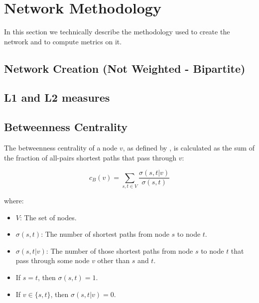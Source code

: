 \section{Network Methodology}
In this section we technically describe the methodology used to create the network and to compute metrics on it.
\subsection{Network Creation (Not Weighted - Bipartite)}


\subsection{L1 and L2 measures}




\subsection{Betweenness Centrality}
The betweenness centrality of a node \(v\), as defined by  \cite{Brandes_2008},
is calculated as the sum of the fraction of all-pairs shortest paths that pass through \(v\):

\begin{equation}
  c_B(v) = \sum_{s,t \in V} \frac{\sigma(s, t|v)}{\sigma(s, t)} \label{eq:betweenness}
\end{equation}

where:

\begin{itemize}
  \setlength\itemsep{0.4em} %
  \item \(V\): The set of nodes.
  \item \(\sigma(s, t)\): The number of shortest paths from node \(s\) to node \(t\).
  \item \(\sigma(s, t|v)\): The number of those shortest paths from node \(s\) to node \(t\) that pass
        through some node \(v\) other than \(s\) and \(t\).
  \item If \(s = t\), then \(\sigma(s, t) = 1\).
  \item If \(v \in \{s, t\}\), then \(\sigma(s, t|v) = 0\).
\end{itemize}

